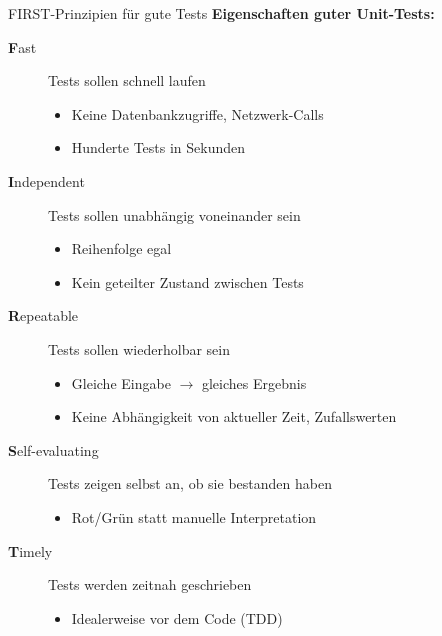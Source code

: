 \begin{frame}{FIRST-Prinzipien für gute Tests}
  \textbf{Eigenschaften guter Unit-Tests:}

  \begin{description}
    \item[\textbf{F}ast] Tests sollen schnell laufen
      \begin{itemize}
        \item Keine Datenbankzugriffe, Netzwerk-Calls
        \item Hunderte Tests in Sekunden
      \end{itemize}

    \item[\textbf{I}ndependent] Tests sollen unabhängig voneinander sein
      \begin{itemize}
        \item Reihenfolge egal
        \item Kein geteilter Zustand zwischen Tests
      \end{itemize}

    \item[\textbf{R}epeatable] Tests sollen wiederholbar sein
      \begin{itemize}
        \item Gleiche Eingabe $\rightarrow$ gleiches Ergebnis
        \item Keine Abhängigkeit von aktueller Zeit, Zufallswerten
      \end{itemize}

    \item[\textbf{S}elf-evaluating] Tests zeigen selbst an, ob sie bestanden haben
      \begin{itemize}
        \item Rot/Grün statt manuelle Interpretation
      \end{itemize}

    \item[\textbf{T}imely] Tests werden zeitnah geschrieben
      \begin{itemize}
        \item Idealerweise vor dem Code (TDD)
      \end{itemize}
  \end{description}
\end{frame}

